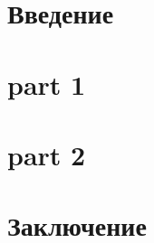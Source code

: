 \documentclass[14pt]{article}
\theoremstyle{definition}
\begin{document}
\pagebreake[2]


\newpage
\tableofcontents
\newpage
\section{Введение}

 
 
 \section{part 1}
 


\newpage
 \section{part 2}
 
 
 




\newpage
\section{Заключение}





\newpage
{}
\begin{thebibliography}{99}




\end{thebibliography}
\end{document}
